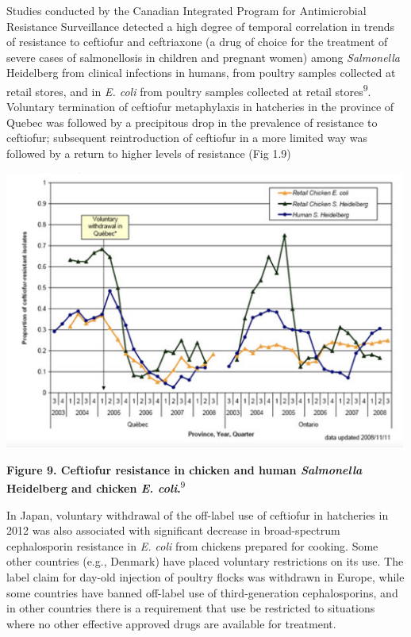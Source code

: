 \documentclass[
]{book}
\begin{document}
Studies conducted by the Canadian Integrated Program for Antimicrobial Resistance Surveillance detected a high degree of temporal correlation in trends of resistance to ceftiofur and ceftriaxone (a drug of choice for the treatment of severe cases of salmonellosis in children and pregnant women) among \emph{Salmonella} Heidelberg from clinical infections in humans, from poultry samples collected at retail stores, and in \emph{E. coli} from poultry samples collected at retail stores\textsuperscript{9}. Voluntary termination of ceftiofur metaphylaxis in hatcheries in the province of Quebec was followed by a precipitous drop in the prevalence of resistance to ceftiofur; subsequent reintroduction of ceftiofur in a more limited way was followed by a return to higher levels of resistance (Fig 1.9)

\includegraphics[width=5.20833in,height=\textheight]{images/Canada_ecoli.png}

\textbf{Figure 9. Ceftiofur resistance in chicken and human \emph{Salmonella} Heidelberg and chicken \emph{E. coli}.}\textsuperscript{9}

In Japan, voluntary withdrawal of the off-label use of ceftiofur in hatcheries in 2012 was also associated with significant decrease in broad-spectrum cephalosporin resistance in \emph{E. coli} from chickens prepared for cooking. Some other countries (e.g., Denmark) have placed voluntary restrictions on its use. The label claim for day-old injection of poultry flocks was withdrawn in Europe, while some countries have banned off-label use of third-generation cephalosporins, and in other countries there is a requirement that use be restricted to situations where no other effective approved drugs are available for treatment.
\end{document}
